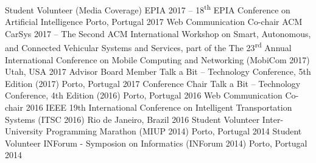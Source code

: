 \clearpage
{}
\begin{cvhonors}
   \cvhonor
    {Student Volunteer (Media Coverage)}
    {EPIA 2017 -- 18\textsuperscript{th} EPIA Conference on Artificial Intelligence}
    {Porto, Portugal}
    {2017}
   \cvhonor
    {Web Communication Co-chair}
    {ACM CarSys 2017 -- The Second ACM International Workshop on Smart, Autonomous, and Connected Vehicular Systems and Services, part of the The 23\textsuperscript{rd} Annual International Conference on Mobile Computing and Networking (MobiCom 2017)}
    {Utah, USA}
    {2017}
   \cvhonor
    {Advisor Board Member}
    {Talk a Bit -- Technology Conference, 5th Edition (2017)}
    {Porto, Portugal}
    {2017}
   \cvhonor
    {Conference Chair}
    {Talk a Bit -- Technology Conference, 4th Edition (2016)}
    {Porto, Portugal}
    {2016}
   \cvhonor
    {Web Communication Co-chair}
    {2016 IEEE 19th International Conference on Intelligent Transportation Systems (ITSC 2016)}
    {Rio de Janeiro, Brazil}
    {2016}
   \cvhonor
    {Student Volunteer}
    {Inter-University Programming Marathon (MIUP 2014)}
    {Porto, Portugal}
    {2014}
   \cvhonor
    {Student Volunteer}
    {INForum - Symposion on Informatics (INForum 2014)}
    {Porto, Portugal}
    {2014}
\end{cvhonors}
